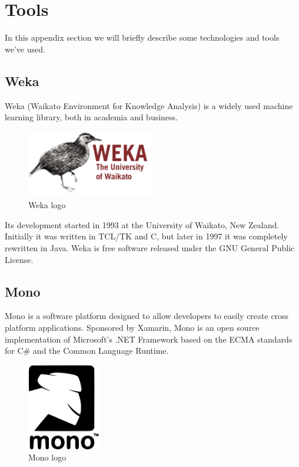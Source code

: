 \documentclass[journal]{IEEEtran/IEEEtran}
\newcommand\subsect[1]{\subsection{#1}\noindent}
\begin{document}
\appendices
\section{Tools}\label{Tools}
In this appendix section we will briefly describe some technologies and tools we've used.

\subsect{Weka}Weka (Waikato Environment for Knowledge Analysis)\cite{weka:2009} is a widely used machine learning library, both in academia and business. 
\begin{figure}[H]
\centering
\includegraphics[width=2.2in]{weka}
\caption{Weka logo}
\label{fig_sim}
\end{figure}
Its development started in 1993 at the University of Waikato, New Zealand. Initially it was written in TCL/TK and C, but later in 1997 it was completely rewritten in Java. Weka is free software released under the GNU General Public License.


\subsect{Mono}Mono is a software platform designed to allow developers to easily create cross platform applications. Sponsored by Xamarin, Mono is an open source implementation of Microsoft's .NET Framework based on the ECMA standards for C\# and the Common Language Runtime.
\begin{figure}[H]
\centering
\includegraphics[width=1.25in]{Mono}
\caption{Mono logo}
\label{fig_sim}
\end{figure}
\end{document}
